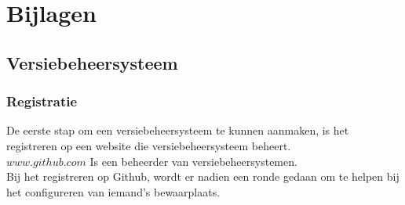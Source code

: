 \documentclass[12pt]{article}
\begin{document}
		\section{Bijlagen}\label{Bijlagen}
			\subsection{Versiebeheersysteem}\label{Git}
				\subsubsection{Registratie}
					De eerste stap om een versiebeheersysteem te kunnen aanmaken, is het registreren op een website die versiebeheersysteem beheert.\\
					$www.github.com$ Is een beheerder van versiebeheersystemen.\\
					Bij het registreren op Github, wordt er nadien een ronde gedaan om te helpen bij het configureren van iemand's bewaarplaats.
					
\end{document}
